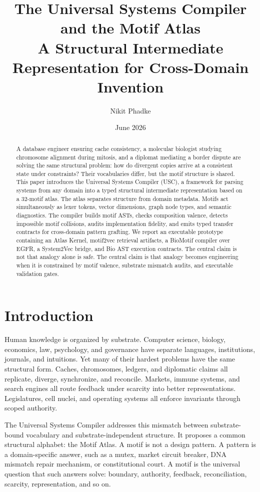 \documentclass[11pt]{article}
\title{\textbf{The Universal Systems Compiler and the Motif Atlas}\\
\large A Structural Intermediate Representation for Cross-Domain Invention}
\author{Nikit Phadke}
\date{June 2026}
\begin{document}
\maketitle

\begin{abstract}
A database engineer ensuring cache consistency, a molecular biologist studying
chromosome alignment during mitosis, and a diplomat mediating a border dispute
are solving the same structural problem: how do divergent copies arrive at a
consistent state under constraints? Their vocabularies differ, but the motif
structure is shared. This paper introduces the Universal Systems Compiler
(USC), a framework for parsing systems from any domain into a typed structural
intermediate representation based on a 32-motif atlas. The atlas separates
structure from domain metadata. Motifs act simultaneously as lexer tokens,
vector dimensions, graph node types, and semantic diagnostics. The compiler
builds motif ASTs, checks composition valence, detects impossible motif
collisions, audits implementation fidelity, and emits typed transfer contracts
for cross-domain pattern grafting. We report an executable prototype containing
an Atlas Kernel, motif2vec retrieval artifacts, a BioMotif compiler over EGFR,
a System2Vec bridge, and Bio AST execution contracts. The central claim is not
that analogy alone is safe. The central claim is that analogy becomes
engineering when it is constrained by motif valence, substrate mismatch audits,
and executable validation gates.
\end{abstract}

\section{Introduction}

Human knowledge is organized by substrate. Computer science, biology,
economics, law, psychology, and governance have separate languages,
institutions, journals, and intuitions. Yet many of their hardest problems have
the same structural form. Caches, chromosomes, ledgers, and diplomatic claims
all replicate, diverge, synchronize, and reconcile. Markets, immune systems,
and search engines all route feedback under scarcity into better
representations. Legislatures, cell nuclei, and operating systems all enforce
invariants through scoped authority.

The Universal Systems Compiler addresses this mismatch between substrate-bound
vocabulary and substrate-independent structure. It proposes a common structural
alphabet: the Motif Atlas. A motif is not a design pattern. A pattern is a
domain-specific answer, such as a mutex, market circuit breaker, DNA mismatch
repair mechanism, or constitutional court. A motif is the universal question
that such answers solve: boundary, authority, feedback, reconciliation,
scarcity, representation, and so on.
\end{document}
